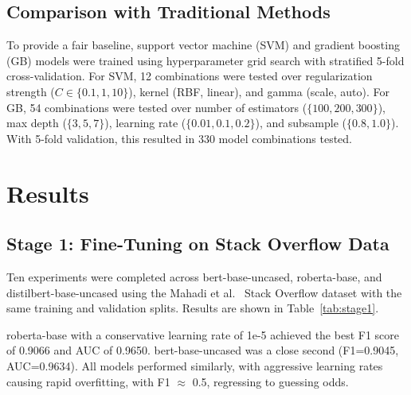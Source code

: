 \documentclass[preprint,12pt]{elsarticle}
\begin{document}
\subsection{Comparison with Traditional Methods}

To provide a fair baseline, support vector machine (SVM) and gradient boosting (GB) models were trained using hyperparameter grid search with stratified 5-fold cross-validation. For SVM, 12 combinations were tested over regularization strength ($C \in \{0.1, 1, 10\}$), kernel (RBF, linear), and gamma (scale, auto). For GB, 54 combinations were tested over number of estimators ($\{100, 200, 300\}$), max depth ($\{3, 5, 7\}$), learning rate ($\{0.01, 0.1, 0.2\}$), and subsample ($\{0.8, 1.0\}$). With 5-fold validation, this resulted in 330 model combinations tested.

\section{Results}

\subsection{Stage 1: Fine-Tuning on Stack Overflow Data}

Ten experiments were completed across bert-base-uncased, roberta-base, and distilbert-base-uncased using the Mahadi et al.~\cite{mahadi2021} Stack Overflow dataset with the same training and validation splits. Results are shown in Table~\ref{tab:stage1}.

roberta-base with a conservative learning rate of 1e-5 achieved the best F1 score of 0.9066 and AUC of 0.9650. bert-base-uncased was a close second (F1=0.9045, AUC=0.9634). All models performed similarly, with aggressive learning rates causing rapid overfitting, with F1 $\approx$ 0.5, regressing to guessing odds.
\end{document}
